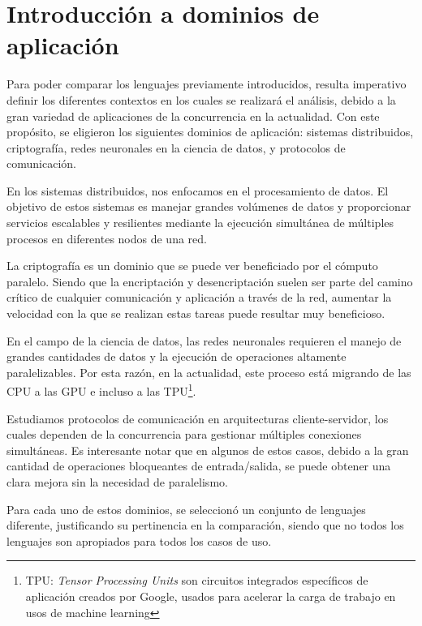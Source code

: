 \documentclass[11pt]{article}
\let\Oldsection\section
\renewcommand{\section}{\FloatBarrier\Oldsection}
\newcommand{\english}[1]{\textit{#1}}
\begin{document}
\newpage %

\section{Introducción a dominios de aplicación}

Para poder comparar los lenguajes previamente introducidos, resulta imperativo definir los diferentes contextos en los cuales se realizará el análisis, debido a la gran variedad de aplicaciones de la concurrencia en la actualidad. Con este propósito, se eligieron los siguientes dominios de aplicación: sistemas distribuidos, criptografía, redes neuronales en la ciencia de datos, y protocolos de comunicación.

En los sistemas distribuidos, nos enfocamos en el procesamiento de datos. El objetivo de estos sistemas es manejar grandes volúmenes de datos y proporcionar servicios escalables y resilientes mediante la ejecución simultánea de múltiples procesos en diferentes nodos de una red.

La criptografía es un dominio que se puede ver beneficiado por el cómputo paralelo. Siendo que la encriptación y desencriptación suelen ser parte del camino crítico de cualquier comunicación y aplicación a través de la red, aumentar la velocidad con la que se realizan estas tareas puede resultar muy beneficioso.

En el campo de la ciencia de datos, las redes neuronales requieren el manejo de grandes cantidades de datos y la ejecución de operaciones altamente paralelizables. Por esta razón, en la actualidad, este proceso está migrando de las CPU a las GPU e incluso a las TPU\footnote{TPU: \english{Tensor Processing Units} son circuitos integrados específicos de aplicación creados por Google, usados para acelerar la carga de trabajo en usos de machine learning}.

Estudiamos protocolos de comunicación en arquitecturas cliente-servidor, los cuales dependen de la concurrencia para gestionar múltiples conexiones simultáneas. Es interesante notar que en algunos de estos casos, debido a la gran cantidad de operaciones bloqueantes de entrada/salida, se puede obtener una clara mejora sin la necesidad de paralelismo.

Para cada uno de estos dominios, se seleccionó un conjunto de lenguajes diferente, justificando su pertinencia en la comparación, siendo que no todos los lenguajes son apropiados para todos los casos de uso. 
\end{document}

